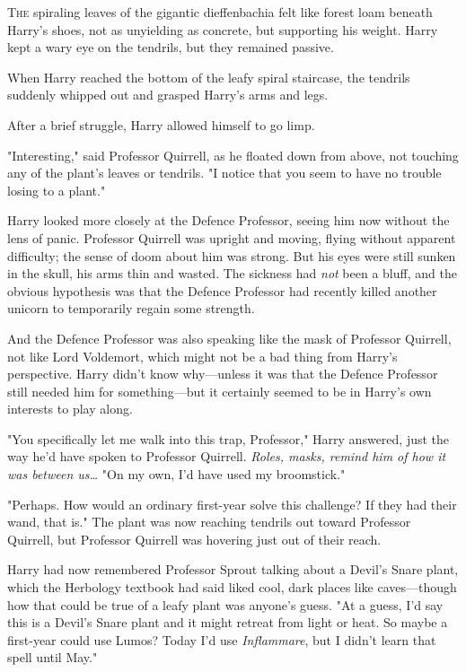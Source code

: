 
\lettrine{T}{he} spiraling
leaves of the gigantic dieffenbachia felt like forest loam beneath Harry's
shoes, not as unyielding as concrete, but supporting his weight. Harry kept a
wary eye on the tendrils, but they remained passive.

When Harry reached the bottom of the leafy spiral staircase, the tendrils
suddenly whipped out and grasped Harry's arms and legs.

After a brief struggle, Harry allowed himself to go limp.

"Interesting," said Professor Quirrell, as he floated down from above, not
touching any of the plant's leaves or tendrils. "I notice that you seem to have
no trouble losing to a plant."

Harry looked more closely at the Defence Professor, seeing him now without the
lens of panic. Professor Quirrell was upright and moving, flying without
apparent difficulty; the sense of doom about him was strong. But his eyes were
still sunken in the skull, his arms thin and wasted. The sickness had
\emph{not} been a bluff, and the obvious hypothesis was that the Defence
Professor had recently killed another unicorn to temporarily regain some
strength.

And the Defence Professor was also speaking like the mask of Professor
Quirrell, not like Lord Voldemort, which might not be a bad thing from Harry's
perspective. Harry didn't know why---unless it was that the Defence Professor
still needed him for something---but it certainly seemed to be in Harry's own
interests to play along.

"You specifically let me walk into this trap, Professor," Harry answered, just
the way he'd have spoken to Professor Quirrell. \emph{Roles, masks, remind him
of how it was between us{\ldots}} "On my own, I'd have used my broomstick."

"Perhaps. How would an ordinary first-year solve this challenge? If they had
their wand, that is." The plant was now reaching tendrils out toward Professor
Quirrell, but Professor Quirrell was hovering just out of their reach.

Harry had now remembered Professor Sprout talking about a Devil's Snare plant,
which the Herbology textbook had said liked cool, dark places like
caves---though how that could be true of a leafy plant was anyone's guess. "At
a guess, I'd say this is a Devil's Snare plant and it might retreat from light
or heat. So maybe a first-year could use Lumos? Today I'd use
\emph{Inflammare}, but I didn't learn that spell until May."

